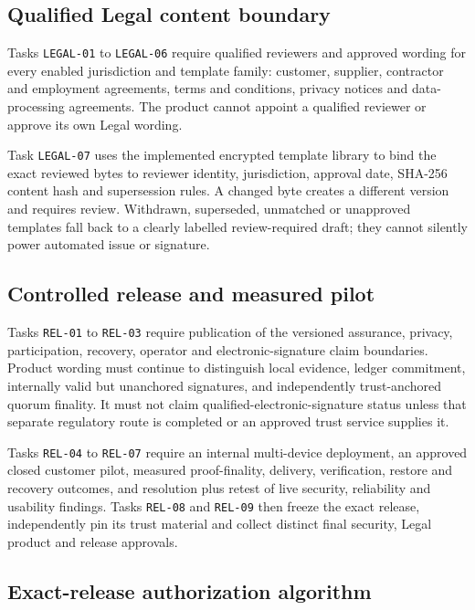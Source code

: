\subsection{Qualified Legal content boundary}

Tasks \texttt{LEGAL-01} to \texttt{LEGAL-06} require qualified reviewers and
approved wording for every enabled jurisdiction and template family: customer,
supplier, contractor and employment agreements, terms and conditions, privacy
notices and data-processing agreements.  The product cannot appoint a qualified
reviewer or approve its own Legal wording.

Task \texttt{LEGAL-07} uses the implemented encrypted template library to bind the
exact reviewed bytes to reviewer identity, jurisdiction, approval date, SHA-256
content hash and supersession rules.  A changed byte creates a different version
and requires review.  Withdrawn, superseded, unmatched or unapproved templates
fall back to a clearly labelled review-required draft; they cannot silently power
automated issue or signature.

\subsection{Controlled release and measured pilot}

Tasks \texttt{REL-01} to \texttt{REL-03} require publication of the versioned
assurance, privacy, participation, recovery, operator and electronic-signature
claim boundaries.  Product wording must continue to distinguish local evidence,
ledger commitment, internally valid but unanchored signatures, and independently
trust-anchored quorum finality.  It must not claim qualified-electronic-signature
status unless that separate regulatory route is completed or an approved trust
service supplies it.

Tasks \texttt{REL-04} to \texttt{REL-07} require an internal multi-device
deployment, an approved closed customer pilot, measured proof-finality, delivery,
verification, restore and recovery outcomes, and resolution plus retest of live
security, reliability and usability findings.  Tasks \texttt{REL-08} and
\texttt{REL-09} then freeze the exact release, independently pin its trust material
and collect distinct final security, Legal product and release approvals.

\subsection{Exact-release authorization algorithm}

